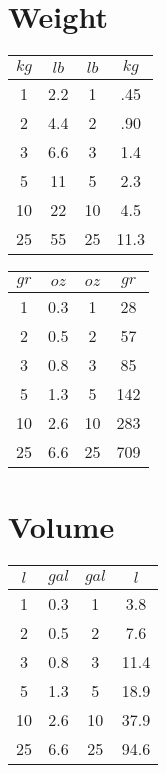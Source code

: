 \documentclass{article}
\begin{document}
\begin{multicols}{2}
\section*{Weight}

\begin{multicols}{2}

\begin{tabular}{cc|cc}
	$kg$ & $lb$ & $lb$ & $kg$ \\ \hline
	1			&	2.2		& 1		& .45 	\\
	2			&	4.4		& 2		& .90 	\\
	3			& 	6.6		& 3		& 1.4 	\\
	5			&	11		& 5		& 2.3 	\\
	10			&	22		& 10	& 4.5 	\\
	25			&	55		& 25	& 11.3 	\\
\end{tabular}

\columnbreak 


\begin{tabular}{cc|cc}
	$gr$ & $oz$ & $oz$ & $gr$ \\ \hline
	1			&	0.3		& 1		& 28 	\\
	2			&	0.5		& 2		& 57 	\\
	3			& 	0.8		& 3		& 85 	\\
	5			&	1.3		& 5		& 142 	\\
	10			&	2.6		& 10	& 283 	\\
	25			&	6.6		& 25	& 709 	\\
\end{tabular}

\end{multicols}

\vspace{1cm}














\section*{Volume}

\begin{multicols}{2}

\begin{tabular}{cc|cc}
	$l$ & $gal$ & $gal$ & $l$ \\ \hline
	1			&	0.3		& 1		& 3.8 	\\
	2			&	0.5		& 2		& 7.6 	\\
	3			& 	0.8		& 3		& 11.4 	\\
	5			&	1.3		& 5		& 18.9 	\\
	10			&	2.6		& 10	& 37.9 	\\
	25			&	6.6		& 25	& 94.6 	\\
\end{tabular}


\end{multicols}
\end{multicols}
\end{document}
